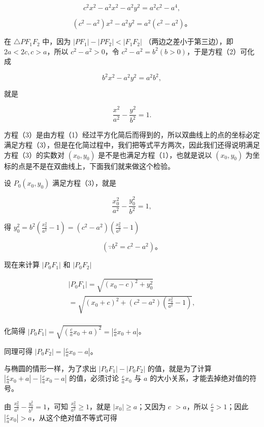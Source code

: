 \[
c^{2} x^{2} - a^{2} x^{2} - a^{2} y^{2} = a^{2} c^{2} - a^{4},
\]

\[
\left(c^{2} - a^{2}\right) x^{2} - a^{2} y^{2} = a^{2} \left(c^{2} - a^{2}\right)\text{。} \tag {2}
\]

在 \(\triangle PF_{1}F_{2}\) 中，因为
\(|PF_{1}| - |PF_{2}| < |F_{1}F_{2}|\) （两边之差小于第三边），即
\(2a < 2c, c > a\)，所以 \(c^2 - a^2 > 0\)，令
\(c^2 - a^2 = b^2 (b > 0)\)，于是方程（2）可化成

\[
b^{2} x^{2} - a^{2} y^{2} = a^{2} b^{2},
\]

就是

\[
\frac {x^{2}}{a^{2}} - \frac {y^{2}}{b^{2}} = 1. \tag {3}
\]

方程（3）是由方程（1）经过平方化简后而得到的，所以双曲线上的点的坐标必定满足方程（3），但是在化简过程中，我们把等式平方两次，因此我们还得说明满足方程（3）的实数对
\((x_0, y_0)\) 是不是也满足方程（1），也就是说以 \((x_0, y_0)\)
为坐标的点是不是在双曲线上，下面我们就来做这个检验。

设 \(P_{0}(x_{0},y_{0})\) 满足方程（3），就是

\[
\frac {x_{0} ^ {2}}{a^{2}} - \frac {y_{0} ^ {2}}{b^{2}} = 1,
\]

得
\(y_0^2 = b^2\left(\frac{x_0^2}{a^2} - 1\right) = (c^2 - a^2)\left(\frac{x_0^2}{a^2} - 1\right)\)

\[
(\because b^{2} = c^{2} - a^{2})\text{。}
\]

现在来计算 \(|P_0F_1|\) 和 \(|P_0F_2|\)

\[
\begin{array}{l} \left| P_{0} F_{1} \right| = \sqrt {\left(x_{0} - c\right) ^ {2} + y_{0} ^ {2}} \\ = \sqrt {\left(x_{0} + c\right) ^ {2} + \left(c^{2} - a^{2}\right) \left(\frac {x_{0} ^ {2}}{a^{2}} - 1\right)}, \\ \end{array}
\]

化简得
\(|P_0F_1| = \sqrt{\left(\frac{c}{a} x_0 + a\right)^2} = \left|\frac{c}{a} x_0 + a\right|\)。

同理可得 \(|P_0F_2| = \left|\frac{c}{a} x_0 - a\right|\)。

与椭圆的情形一样，为了求出 \(|P_0F_1| - |P_0F_2|\) 的值，就是为了计算
\(\left|\frac{c}{a} x_0 + a\right| - \left|\frac{c}{a} x_0 - a\right|\)
的值，必须讨论 \(\frac{c}{a} x_0\) 与 \(a\)
的大小关系，才能去掉绝对值的符号。

由 \(\frac{x_0^2}{a^2} -\frac{y_0^2}{b^2} = 1\)，可知
\(\frac{x_0^2}{a^2}\geqslant 1\)，就是 \(|x_0|\geqslant a\)；又因为
\(c\) \(>a\)，所以 \(\frac{c}{a} >1\)；因此
\(\left|\frac{c}{a} x_0\right| > a\)，从这个绝对值不等式可得

